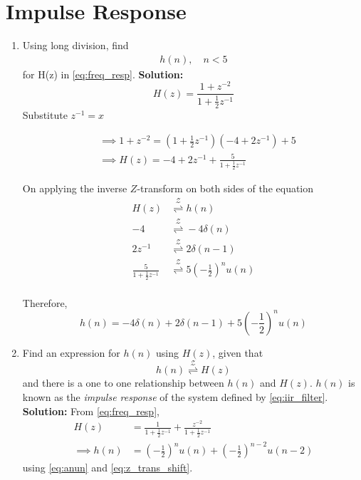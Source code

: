 \documentclass[journal,12pt,twocolumn]{IEEEtran}
\newcommand{\solution}{\noindent \textbf{Solution: }}
\providecommand{\brak}[1]{\ensuremath{\left(#1\right)}}
\providecommand{\ztrans}{\overset{\mathcal{Z}}{ \rightleftharpoons}}
\numberwithin{equation}{section}
\renewcommand\thesection{\arabic{section}}
\begin{document}
\section{Impulse Response}
\begin{enumerate}[label=\thesection.\arabic*]
\item Using long division, 
find
		\begin{align}
			h(n), \quad n < 5
		\end{align}
		for H(z) in 
		\eqref{eq:freq_resp}.
\solution 
	\begin{equation}
		H(z) = \frac{1 + z^{-2}}{1 + \frac12 z^{-1}}
	\end{equation}
	Substitute $z^{-1} = x$
	
	\begin{align}
		&\implies 1 + z^{-2} = \brak{1 + \frac12 z^{-1}}\brak{-4 + 2z^{-1}} + 5 \\
		&\implies H(z) = -4 + 2z^{-1} + \frac{5}{1 + \frac12 z^{-1}}
	\end{align}
	
	On applying the inverse $Z$-transform on both sides of the equation
	\begin{align}
		H(z) &\ztrans h(n) \\
		-4 &\ztrans -4\delta(n) \\
		2z^{-1} &\ztrans 2\delta(n - 1) \\
		\frac{5}{1 + \frac12 z^{-1}} &\ztrans 5\brak{-\frac12}^n u(n) \\
	\end{align}
	
	Therefore,
	\begin{equation}
		h(n) = -4\delta(n) + 2\delta(n - 1) + 5\brak{-\frac12}^n u(n)
	\end{equation}
\item \label{prob:impulse_resp}
Find an expression for $h(n)$ using $H(z)$, given that 
\begin{equation}
\label{eq:impulse_resp}
h(n) \ztrans H(z)
\end{equation}
and there is a one to one relationship between $h(n)$ and $H(z)$. $h(n)$ is known as the {\em impulse response} of the
system defined by \eqref{eq:iir_filter}.
\\
\solution From \eqref{eq:freq_resp},
\begin{align}
H(z) &= \frac{1}{1 + \frac{1}{2}z^{-1}} + \frac{ z^{-2}}{1 + \frac{1}{2}z^{-1}}
\\
\implies h(n) &= \brak{-\frac{1}{2}}^{n}u(n) + \brak{-\frac{1}{2}}^{n-2}u(n-2)
\end{align}
using \eqref{eq:anun} and \eqref{eq:z_trans_shift}.


\end{enumerate}
\end{document}
